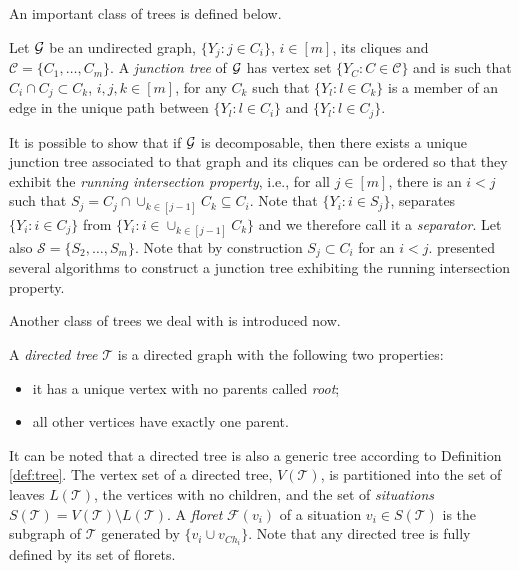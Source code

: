 An important class of trees is defined below. 
\begin{definition}
Let $\mathcal{G}$ be an undirected graph, $\{Y_j:j\in C_i\}$, $i\in[m]$, its cliques and $\mathcal{C}=\{C_1,\dots,C_m\}$. A \emph{junction tree} of $\mathcal{G}$ has vertex set $\{Y_C: C\in\mathcal{C}\}$ and is such that $C_i\cap C_j\subset C_k$, $i,j,k \in[m]$, for any $C_k$ such that $\{Y_l:l\in C_k\}$ is a member of an edge in the unique path between $\{Y_l:l\in C_i\}$ and $\{Y_l:l\in C_j\}$.
\end{definition}
It is possible to show that if $\mathcal{G}$ is decomposable, then there exists a unique junction tree associated to that graph and its cliques can be ordered so that they exhibit the \textit{running intersection property}, i.e., for all $j\in [m]$, there is an $i<j$ such that $S_{j}=C_j\cap \cup_{k\in [j-1]}C_k\subseteq C_i$. Note that $\{Y_i: i\in S_j\}$,  separates $\{Y_i: i\in C_j\}$ from $\{Y_i: i\in \cup_{k\in [j-1]}C_k\}$ and we therefore call it a \textit{separator}. Let also $\mathcal{S}=\{S_2,\dots,S_m\}$. Note that by construction $S_j\subset C_i$ for an $i<j$.  \citet{Cowell1999a} presented several algorithms to construct a junction tree exhibiting the running intersection property. 

Another class of trees we deal with is introduced now. 
\begin{definition}
 A \emph{directed tree} $\mathcal{T}$  is a directed graph with the following two properties:
 \begin{itemize}
 \item it has a unique vertex with no parents called \textit{root};
 \item all other vertices have exactly one parent.
 \end{itemize}
\end{definition}   
It can be noted that a directed tree is also a generic tree according to Definition \ref{def:tree}. The vertex set of a directed tree, $V(\mathcal{T})$, is  partitioned into the set of leaves $L(\mathcal{T})$, the vertices with no children, and the set of \textit{situations} $S(\mathcal{T})=V(\mathcal{T})\setminus L(\mathcal{T})$. A \textit{floret} $\mathcal{F}(v_i)$ of a situation $v_i\in S(\mathcal{T})$ is the subgraph of $\mathcal{T}$ generated by $\{v_i\cup v_{Ch_i}\}$. Note that any directed tree is fully defined by  its set of florets. 